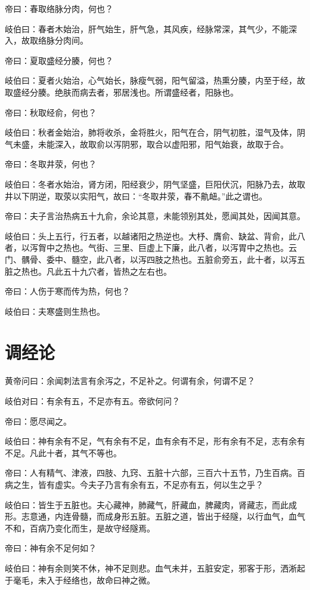 \documentclass{article}%
\begin{document}
帝曰：春取络脉分肉，何也？

岐伯曰：春者木始治，肝气始生，肝气急，其风疾，经脉常深，其气少，不能深入，故取络脉分肉间。

帝曰：夏取盛经分腠，何也？

岐伯曰：夏者火始治，心气始长，脉瘦气弱，阳气留溢，热熏分腠，内至于经，故取盛经分腠。绝肤而病去者，邪居浅也。所谓盛经者，阳脉也。

帝曰：秋取经俞，何也？

岐伯曰：秋者金始治，肺将收杀，金将胜火，阳气在合，阴气初胜，湿气及体，阴气未盛，未能深入，故取俞以泻阴邪，取合以虚阳邪，阳气始衰，故取于合。

帝曰：冬取井荥，何也？

岐伯曰：冬者水始治，肾方闭，阳经衰少，阴气坚盛，巨阳伏沉，阳脉乃去，故取井以下阴逆，取荥以实阳气，故曰：“冬取井荥，春不鼽衄。”此之谓也。

帝曰：夫子言治热病五十九俞，余论其意，未能领别其处，愿闻其处，因闻其意。

岐伯曰：头上五行，行五者，以越诸阳之热逆也。大杼、膺俞、缺盆、背俞，此八者，以泻胷中之热也。气街、三里、巨虚上下廉，此八者，以泻胃中之热也。云门、髃骨、委中、髓空，此八者，以泻四肢之热也。五脏俞旁五，此十者，以泻五脏之热也。凡此五十九穴者，皆热之左右也。

帝曰：人伤于寒而传为热，何也？

岐伯曰：夫寒盛则生热也。
\section{调经论}
黄帝问曰：余闻刺法言有余泻之，不足补之。何谓有余，何谓不足？

岐伯对曰：有余有五，不足亦有五。帝欲何问？

帝曰：愿尽闻之。

岐伯曰：神有余有不足，气有余有不足，血有余有不足，形有余有不足，志有余有不足。凡此十者，其气不等也。

帝曰：人有精气、津液，四肢、九窍、五脏十六部，三百六十五节，乃生百病。百病之生，皆有虚实。今夫子乃言有余有五，不足亦有五，何以生之乎？

岐伯曰：皆生于五脏也。夫心藏神，肺藏气，肝藏血，脾藏肉，肾藏志，而此成形。志意通，内连骨髓，而成身形五脏。五脏之道，皆出于经隧，以行血气，血气不和，百病乃变化而生，是故守经隧焉。

帝曰：神有余不足何如？

岐伯曰：神有余则笑不休，神不足则悲。血气未并，五脏安定，邪客于形，洒淅起于毫毛，未入于经络也，故命曰神之微。
\end{document}

